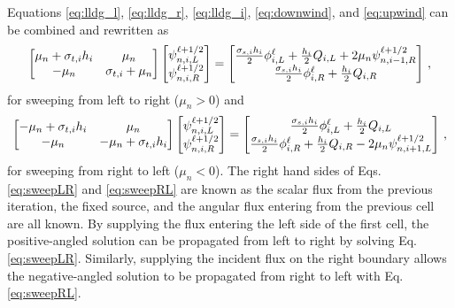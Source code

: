 Equations \ref{eq:lldg_l}, \ref{eq:lldg_r}, \ref{eq:lldg_i}, \ref{eq:downwind}, and \ref{eq:upwind} can be combined and rewritten as 
	\begin{equation} \label{eq:sweepLR}
		\left[\begin{matrix}
			\mu_n + \sigma_{t,i} h_i & \mu_n  \\ 
			-\mu_n & \sigma_{t,i} + \mu_n \\ 
		\end{matrix}\right]
		\left[\begin{matrix}
			\psi_{n,i,L}^{\ell+1/2} \\ \psi_{n,i,R}^{\ell+1/2}
		\end{matrix}\right]
		= \left[\begin{matrix}
			\frac{\sigma_{s,i}h_i}{2} \phi_{i,L}^\ell + \frac{h_i}{2} Q_{i,L} + 2\mu_n \psi_{n,i-1,R}^{\ell+1/2} \\
			\frac{\sigma_{s,i}h_i}{2} \phi_{i,R}^\ell + \frac{h_i}{2} Q_{i,R} 
		\end{matrix}\right] \,, 
	\end{equation}
for sweeping from left to right ($\mu_n > 0$) and 
	\begin{equation} \label{eq:sweepRL}
		\left[\begin{matrix} 
			-\mu_n + \sigma_{t,i}h_i & \mu_n \\ 
			-\mu_n & -\mu_n + \sigma_{t,i}h_i \\ 
		\end{matrix} \right]
		\left[\begin{matrix}
			\psi_{n,i,L}^{\ell+1/2} \\ \psi_{n,i,R}^{\ell+1/2}
		\end{matrix} \right]
		= \left[\begin{matrix}
			\frac{\sigma_{s,i}h_i}{2} \phi_{i,L}^\ell + \frac{h_i}{2} Q_{i,L} \\ 
			\frac{\sigma_{s,i}h_i}{2} \phi_{i,R}^\ell + \frac{h_i}{2} Q_{i,R} - 2\mu_n \psi_{n,i+1,L}^{\ell+1/2}
		\end{matrix} \right]
		\,, 
	\end{equation}
for sweeping from right to left ($\mu_n < 0$). The right hand sides of Eqs. \ref{eq:sweepLR} and \ref{eq:sweepRL} are known as the scalar flux from the previous iteration, the fixed source, and the angular flux entering from the previous cell are all known. By supplying the flux entering the left side of the first cell, the positive-angled solution can be propagated from left to right by solving Eq. \ref{eq:sweepLR}. Similarly, supplying the incident flux on the right boundary allows the negative-angled solution to be propagated from right to left with Eq. \ref{eq:sweepRL}. 

